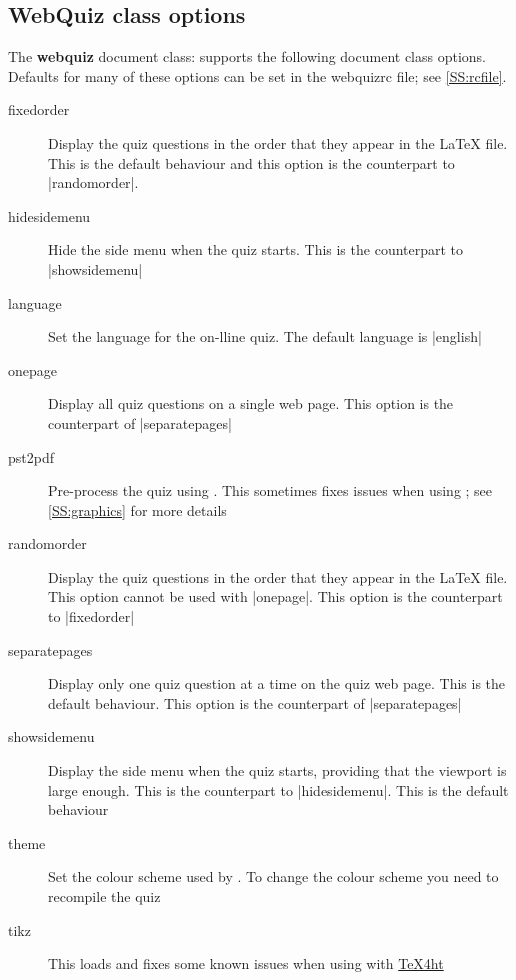 \documentclass[svgnames]{article}
\newcommand\TeXfht{\href{https://www.ctan.org/tex4ht}{TeX4ht}\xspace}
\newcommand\webquizrc{\index{webquizrc}\textsf{webquizrc}\xspace}
\begin{document}
\subsection{WebQuiz class options}\label{SS:classOptions}

The \textbf{webquiz} document class: supports the following document
class options. Defaults for many of these options can be set in the
\webquizrc file; see \autoref{SS:rcfile}.

  \begin{description}

    \item[fixedorder] Display the quiz questions in the order that they
    appear in the \LaTeX{} file. This is the default behaviour and this
    option is the counterpart to \LatexCode|randomorder|.

    \item[hidesidemenu]
    Hide the side menu when the quiz starts. This is the counterpart to
    \LatexCode|showsidemenu|

    \item[language]
    Set the language for the on-lline quiz. The default language is
    \LatexCode|english|

    \item[onepage] Display all quiz questions on a single web page.
    This option is the counterpart of \LatexCode|separatepages|

    \item[pst2pdf]
    Pre-process the quiz using . This sometimes fixes
    issues when using ; see \autoref{SS:graphics} for
    more details

    \item[randomorder]
    Display the quiz questions in the order that they appear in the
    \LaTeX{} file. This option cannot be used with \LatexCode|onepage|.
    This option is the counterpart to \LatexCode|fixedorder|

    \item[separatepages]
    Display only one quiz question at a time on the quiz web page. This
    is the default behaviour. This option is the counterpart of
    \LatexCode|separatepages|

    \item[showsidemenu]
    Display the side menu when the quiz starts, providing that the
    viewport is large enough. This is the counterpart to
    \LatexCode|hidesidemenu|. This is the default behaviour

    \item[theme]
    Set the colour scheme used by \WebQuiz. To change the colour scheme
    you need to recompile the quiz

    \item[tikz]
    This loads  and fixes some known issues when using
     with \TeXfht

  \end{description}
\end{document}
